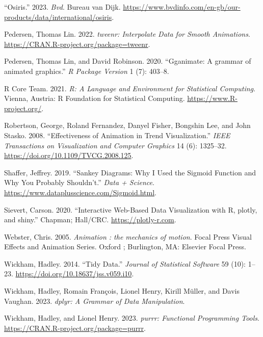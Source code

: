 \begin{CSLReferences}{1}{0}
\leavevmode{}%
{``Osiris.''} 2023. \emph{Bvd}. Bureau van Dijk. \url{https://www.bvdinfo.com/en-gb/our-products/data/international/osiris}.

\leavevmode{}%
Pedersen, Thomas Lin. 2022. \emph{{tweenr: Interpolate Data for Smooth Animations}}. \url{https://CRAN.R-project.org/package=tweenr}.

\leavevmode{}%
Pedersen, Thomas Lin, and David Robinson. 2020. {``{Gganimate: A grammar of animated graphics}.''} \emph{R Package Version} 1 (7): 403--8.

\leavevmode{}%
R Core Team. 2021. \emph{{R: A Language and Environment for Statistical Computing}}. Vienna, Austria: R Foundation for Statistical Computing. \url{https://www.R-project.org/}.

\leavevmode{}%
Robertson, George, Roland Fernandez, Danyel Fisher, Bongshin Lee, and John Stasko. 2008. {``{Effectiveness of Animation in Trend Visualization}.''} \emph{IEEE Transactions on Visualization and Computer Graphics} 14 (6): 1325--32. \url{https://doi.org/10.1109/TVCG.2008.125}.

\leavevmode{}%
Shaffer, Jeffrey. 2019. {``{Sankey Diagrams: Why I Used the Sigmoid Function and Why You Probably Shouldn't}.''} \emph{Data + Science}. \url{https://www.dataplusscience.com/Sigmoid.html}.

\leavevmode{}%
Sievert, Carson. 2020. {``{Interactive {Web-Based} Data Visualization with R, plotly, and shiny}.''} Chapman; Hall/CRC. \url{https://plotly-r.com}.

\leavevmode{}%
Webster, Chris. 2005. \emph{{Animation : the mechanics of motion}}. Focal Press Visual Effects and Animation Series. Oxford ; Burlington, MA: Elsevier Focal Press.

\leavevmode{}%
Wickham, Hadley. 2014. {``{Tidy Data}.''} \emph{Journal of Statistical Software} 59 (10): 1--23. \url{https://doi.org/10.18637/jss.v059.i10}.

\leavevmode{}%
Wickham, Hadley, Romain François, Lionel Henry, Kirill Müller, and Davis Vaughan. 2023. \emph{{dplyr: A Grammar of Data Manipulation}}.

\leavevmode{}%
Wickham, Hadley, and Lionel Henry. 2023. \emph{{purrr: Functional Programming Tools}}. \url{https://CRAN.R-project.org/package=purrr}.

\end{CSLReferences}

